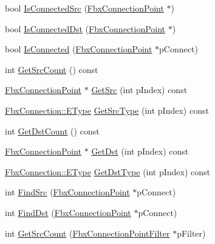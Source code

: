 \begin{DoxyCompactItemize}
\item 
bool \hyperlink{class_fbx_connection_point_accccefb83ec8fa6eda6bdab0d1b927f9}{Is\+Connected\+Src} (\hyperlink{class_fbx_connection_point}{Fbx\+Connection\+Point} $\ast$)
\item 
bool \hyperlink{class_fbx_connection_point_a2912fa4a5e115ba7a3945bd7c75c6c0c}{Is\+Connected\+Dst} (\hyperlink{class_fbx_connection_point}{Fbx\+Connection\+Point} $\ast$)
\item 
bool \hyperlink{class_fbx_connection_point_ae56a50c64319e5ada97945990539c0ac}{Is\+Connected} (\hyperlink{class_fbx_connection_point}{Fbx\+Connection\+Point} $\ast$p\+Connect)
\item 
int \hyperlink{class_fbx_connection_point_ad75a1c4144fdfaf7e8bdf4537708ea7c}{Get\+Src\+Count} () const
\item 
\hyperlink{class_fbx_connection_point}{Fbx\+Connection\+Point} $\ast$ \hyperlink{class_fbx_connection_point_a87dcd2781e9860479e780c807f7e9b2b}{Get\+Src} (int p\+Index) const
\item 
\hyperlink{class_fbx_connection_a3df448a5db356652ab99fd2be2553749}{Fbx\+Connection\+::\+E\+Type} \hyperlink{class_fbx_connection_point_ab7147b771ece407b567b68743e53d96f}{Get\+Src\+Type} (int p\+Index) const
\item 
int \hyperlink{class_fbx_connection_point_a79f98c92a9b781bf056865632c2b4db7}{Get\+Dst\+Count} () const
\item 
\hyperlink{class_fbx_connection_point}{Fbx\+Connection\+Point} $\ast$ \hyperlink{class_fbx_connection_point_ad31242315b645c26f4871d3fb33b098f}{Get\+Dst} (int p\+Index) const
\item 
\hyperlink{class_fbx_connection_a3df448a5db356652ab99fd2be2553749}{Fbx\+Connection\+::\+E\+Type} \hyperlink{class_fbx_connection_point_af328bd58235b6255226320b9d69a606f}{Get\+Dst\+Type} (int p\+Index) const
\item 
int \hyperlink{class_fbx_connection_point_ae9ca592d1619b4674b4372f89e9b390a}{Find\+Src} (\hyperlink{class_fbx_connection_point}{Fbx\+Connection\+Point} $\ast$p\+Connect)
\item 
int \hyperlink{class_fbx_connection_point_a3ac484764349d3616dfcbe2c07d4fc27}{Find\+Dst} (\hyperlink{class_fbx_connection_point}{Fbx\+Connection\+Point} $\ast$p\+Connect)
\item 
int \hyperlink{class_fbx_connection_point_a9030ce8968862af50b096d1be9c6e394}{Get\+Src\+Count} (\hyperlink{class_fbx_connection_point_filter}{Fbx\+Connection\+Point\+Filter} $\ast$p\+Filter)
\item 

\end{DoxyCompactItemize}
